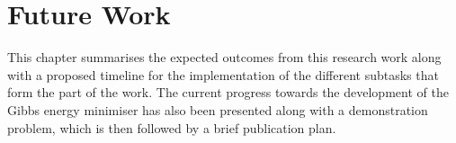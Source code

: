\chapter{Future Work} \label{chap:future}


	This chapter summarises the expected outcomes from this research work along with a proposed timeline for the implementation of the different subtasks that form the part of the work. The current progress towards the development of the Gibbs energy minimiser has also been presented along with a demonstration problem, which is then followed by a brief publication plan.
